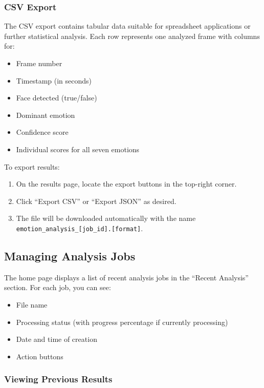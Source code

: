 \subsubsection{CSV Export}

The CSV export contains tabular data suitable for spreadsheet applications or further statistical analysis. Each row represents one analyzed frame with columns for:
\begin{itemize}
    \item Frame number
    \item Timestamp (in seconds)
    \item Face detected (true/false)
    \item Dominant emotion
    \item Confidence score
    \item Individual scores for all seven emotions
\end{itemize}

To export results:
\begin{enumerate}
    \item On the results page, locate the export buttons in the top-right corner.
    \item Click ``Export CSV'' or ``Export JSON'' as desired.
    \item The file will be downloaded automatically with the name \texttt{emotion\_analysis\_[job\_id].[format]}.
\end{enumerate}

\subsection{Managing Analysis Jobs}

The home page displays a list of recent analysis jobs in the ``Recent Analysis'' section. For each job, you can see:

\begin{itemize}
    \item File name
    \item Processing status (with progress percentage if currently processing)
    \item Date and time of creation
    \item Action buttons
\end{itemize}

\subsubsection{Viewing Previous Results}

